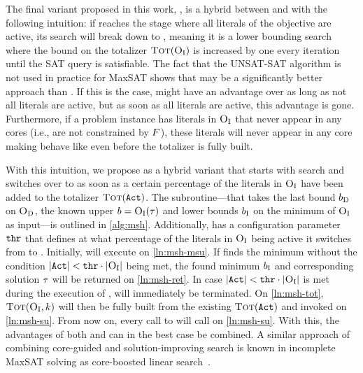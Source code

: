 The final variant proposed in this work, \msh{}, is a hybrid between \msu{} and \satunsat{} with the following intuition:
if \msu{}  reaches the stage where all literals of the objective are active, its search will break down to \unsatsat{}, meaning it is a lower bounding search where the bound on the totalizer $\textsc{Tot}(\textsc{O}_{\text{I}})$ is increased by one every iteration until the SAT query is satisfiable.
The fact that the UNSAT-SAT algorithm is not used in practice for MaxSAT shows that \satunsat{} may be a significantly better approach than \unsatsat{}.
If this is the case, \msu{} might have an advantage over \satunsat{} as long as not all literals are active, but as soon as all literals are active, this advantage is gone.
Furthermore, if a problem instance has literals in $\textsc{O}_{\text{I}}$ that never appear in any cores (i.e., are not constrained by $F$), these literals will never appear in any core making \msu{} behave like \unsatsat{} even before the totalizer is fully built.

With this intuition, we propose \msh{} as a hybrid variant that starts with \msu{} search and switches over to \satunsat{} as soon as a certain percentage of the literals in $\textsc{O}_{\text{I}}$ have been added to the totalizer $\textsc{Tot}(\texttt{Act})$.
The subroutine---that takes the last bound $b_{\text{D}}$ on $\textsc{O}_{\text{D}}$, the known upper $b=\textsc{O}_{\text{I}}(\tau)$ and lower bounds $b_{\text{I}}$ on the minimum of $\textsc{O}_{\text{I}}$ as input---is outlined in \cref{alg:msh}.
Additionally, \msh{} has a configuration parameter $\texttt{thr}$ that defines at what percentage of the literals in $\textsc{O}_{\text{I}}$ being active it switches from \msu{} to \satunsat{}.
Initially, \msh{} will execute \msu{} on \cref{ln:msh-msu}.
If \msu{} finds the minimum without the condition $|\texttt{Act}| < \texttt{thr} \cdot |\textsc{O}_{\text{I}}|$ being met, the found minimum $b_{\text{I}}$ and corresponding solution $\tau$ will be returned on \cref{ln:msh-ret}.
In case $|\texttt{Act}| < \texttt{thr} \cdot |\textsc{O}_{\text{I}}|$ is met during the execution of \msu{}, \msu{} will immediately be terminated.
On \cref{ln:msh-tot}, $\textsc{Tot}(\textsc{O}_{\text{I}},k)$ will then be fully built from the existing $\textsc{Tot}(\texttt{Act})$ and \satunsat{} invoked on \cref{ln:msh-su}.
From now on, every call to \msh{} will call \satunsat{} on \cref{ln:msh-su}.
With this, the advantages of both \msu{} and \satunsat{} can in the best case be combined.
A similar approach of combining core-guided and solution-improving search is known in incomplete MaxSAT solving as core-boosted linear search~\autocite{DBLP:conf/cpaior/BergDS19}.

